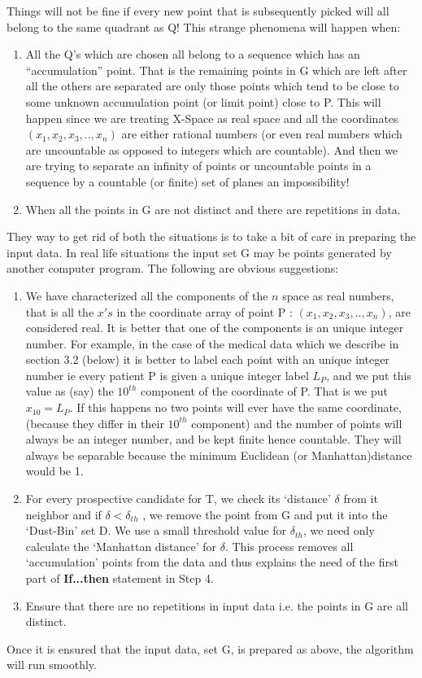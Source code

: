 \documentclass[english]{article}
\begin{document}
Things will not be fine if every new point that is subsequently picked
will all belong to the same quadrant as Q! This strange phenomena
will happen when: 
\begin{enumerate}
\item All the Q's which are chosen all belong to a sequence which has an
{}``accumulation'' point. That is the remaining points in G which
are left after all the others are separated are only those points
which tend to be close to some unknown accumulation point (or limit
point) close to P. This will happen since we are treating X-Space
as real space and all the coordinates $(x_{1},x_{2},x_{3},..,x_{n})$
are either rational numbers (or even real numbers which are uncountable as opposed to integers which
are countable). And then we are trying to separate an infinity of points  or uncountable points in a sequence by a countable (or finite) set of planes an impossibility! 
\item When all the points in G are not distinct and there are repetitions
in data. 
\end{enumerate}
They way to get rid of both the situations is to take a bit of care
in preparing the input data. In real life situations the input set G may be points generated by another computer program. The following are obvious suggestions:
\begin{enumerate}
\item We have characterized all the components of the $n$ space as real
numbers, that is all the $x's$ in the coordinate array of point P
: $(x_{1},x_{2},x_{3},..,x_{n})$, are considered real. It is better
that one of the components is an unique integer number. For example,
in the case of the medical data which we describe in section 3.2 (below)
it is better to label each point with an unique integer number ie
every patient P is given a unique integer label $L_{P}$, and we put
this value as (say) the $10^{th}$ component of the coordinate of
P. That is we put $x_{10}=L_{P}$. If this happens no two points will
ever have the same coordinate, (because they differ in their $10^{th}$
component) and the number of points will always be an integer number,
and be kept finite hence countable. They will always be separable because the minimum
Euclidean (or Manhattan)distance would be 1.
\item For every prospective candidate for T, we check its `distance' $\delta$
from it neighbor and if $\delta<\delta_{th}$ , we remove the point
from G and put it into the `Dust-Bin' set D. We use a small threshold
value for $\delta_{th}$, we need only calculate the `Manhattan distance'
for $\delta$. This process removes all `accumulation' points from
the data and thus explains the need of the first part of \textbf{If...then}
statement in Step 4.
\item Ensure that there are no repetitions in input data i.e. the points
in G are all distinct.
\end{enumerate}
Once it is ensured that the input data, set G, is prepared as above,
the algorithm will run smoothly.
\end{document}
